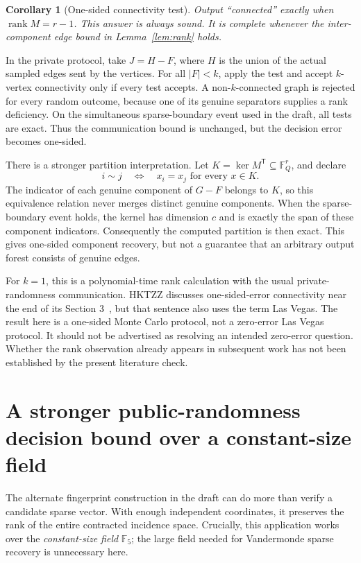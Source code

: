 \documentclass[11pt]{article}
\newtheorem{corollary}[theorem]{Corollary}
\theoremstyle{remark}\newtheorem{remark}[theorem]{Remark}
\newcommand{\F}{\mathbb F}
\newcommand{\rank}{\operatorname{rank}}
\begin{document}
\begin{corollary}[One-sided connectivity test]
Output ``connected'' exactly when $\rank M=r-1$. This answer is always sound. It is complete whenever the inter-component edge bound in Lemma~\ref{lem:rank} holds.
\end{corollary}

In the private protocol, take $J=H-F$, where $H$ is the union of the actual sampled edges sent by the vertices. For all $|F|<k$, apply the test and accept $k$-vertex connectivity only if every test accepts. A non-$k$-connected graph is rejected for every random outcome, because one of its genuine separators supplies a rank deficiency. On the simultaneous sparse-boundary event used in the draft, all tests are exact. Thus the communication bound is unchanged, but the decision error becomes one-sided.

There is a stronger partition interpretation. Let $K=\ker M^{\mathsf T}\subseteq\F_Q^r$, and declare
\[
 i\sim j\quad\Longleftrightarrow\quad x_i=x_j\text{ for every }x\in K.
\]
The indicator of each genuine component of $G-F$ belongs to $K$, so this equivalence relation never merges distinct genuine components. When the sparse-boundary event holds, the kernel has dimension $c$ and is exactly the span of these component indicators. Consequently the computed partition is then exact. This gives one-sided component recovery, but not a guarantee that an arbitrary output forest consists of genuine edges.

For $k=1$, this is a polynomial-time rank calculation with the usual private-randomness communication. HKTZZ discusses one-sided-error connectivity near the end of its Section 3~\cite{HKTZZ19}, but that sentence also uses the term Las Vegas. The result here is a one-sided Monte Carlo protocol, not a zero-error Las Vegas protocol. It should not be advertised as resolving an intended zero-error question. Whether the rank observation already appears in subsequent work has not been established by the present literature check.

\section{A stronger public-randomness decision bound over a constant-size field}\label{sec:constant-rank}
The alternate fingerprint construction in the draft can do more than verify a candidate sparse vector. With enough independent coordinates, it preserves the rank of the entire contracted incidence space. Crucially, this application works over the \emph{constant-size field} $\F_5$; the large field needed for Vandermonde sparse recovery is unnecessary here.
\end{document}
